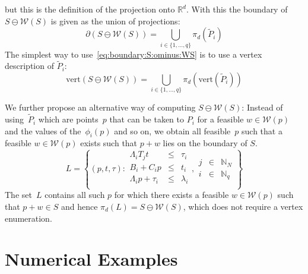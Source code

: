 \documentclass[a4paper, 12pt, twoside]{article}
\theoremstyle{definition}
\numberwithin{equation}{section}
\begin{document}
%
but this is the definition of the projection onto $\mathbb R^d$.
%
With this the boundary of $S\ominus \mathcal W(S)$ is given as the union of projections:
%
\begin{equation}\label{eq:boundary:S:ominus:WS}
 \partial(S\ominus\mathcal W(S)) = \bigcup_{i\in\{1,\dots,q\}}\pi_d\left(
\tilde P_i
 \right)
\end{equation}
%
The simplest way to use~\eqref{eq:boundary:S:ominus:WS} is to use a vertex description of $\tilde P_i$:
%
\begin{equation}\label{the:way:we:compute:p:pontryagin:differences}
  \text{vert}(S\ominus\mathcal W(S)) = \bigcup_{i\in\{1,\dots,q\}}\pi_d(\text{vert}(\tilde P_i))
\end{equation}

We further propose an alternative way of computing $S\ominus\mathcal W(S)$:
%
Instead of using~$\tilde P_i$ which are points~$p$ that can be taken to $P_i$ for a feasible $w\in\mathcal W(p)$ and the values of the~$\phi_i(p)$ and so on, we obtain all feasible~$p$ such that a feasible $w\in\mathcal W(p)$ exists such that $p+w$ lies on the boundary of $S$.
%
\begin{equation}
  L = \left\{(p,t,\tau):\begin{array}{rcl}
  \Lambda_iT_jt&\leq&\tau_i\\
  B_i+C_i p&\leq& t_i\\
  \Lambda_i p + \tau_i&\leq&\lambda_i\\
  \end{array},\begin{array}{rcl}
  j&\in&\mathbb N_N\\
  i&\in&\mathbb N_q\end{array}
  \right\}
\end{equation}
%
The set~$L$ contains all such $p$ for which there exists a feasible $w\in\mathcal W(p)$ such that $p+w\in S$ and hence $\pi_d(L)=S\ominus\mathcal W(S)$, which does not require a vertex enumeration.
%
%
%
%
%
\section{Numerical Examples}\label{sec:numerical:examples}
\end{document}
